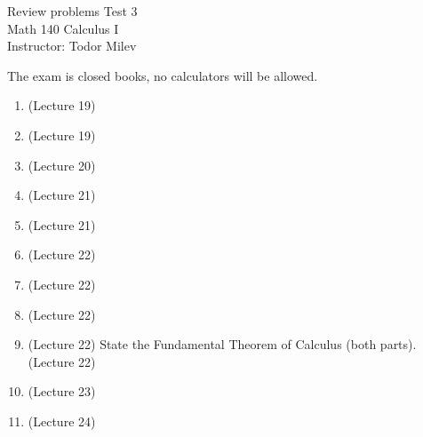 \documentclass{article}
\begin{document}
\begin{center}
\Large
Review problems Test 3\\ Math 140 Calculus I \\ \normalsize Instructor: Todor Milev
\end{center}


\noindent The exam is closed books, no calculators will be allowed.

\begin{enumerate}
\item (Lecture 19) 
\item (Lecture 19) 
\item (Lecture 20) 
\item (Lecture 21) 
\item (Lecture 21) 
\item (Lecture 22) 
\item (Lecture 22) 

\item (Lecture 22) 
\item (Lecture 22) State the Fundamental Theorem of Calculus (both parts). (Lecture 22)

\item (Lecture 23) 

\item (Lecture 24)



\end{enumerate}













\end{document}
